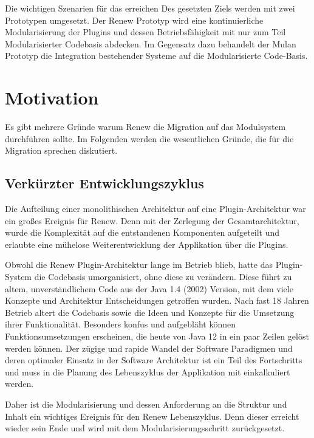 	Die wichtigen Szenarien für das erreichen Des gesetzten Ziels werden mit zwei Prototypen umgesetzt. Der Renew Prototyp wird eine kontinuierliche  Modularisierung der Plugins und dessen Betriebsfähigkeit mit nur zum Teil Modularisierter Codebasis abdecken. Im Gegensatz dazu behandelt der Mulan Prototyp die Integration bestehender Systeme auf die Modularisierte Code-Basis. 




\section{Motivation}\label{sec:motivation}
Es gibt mehrere Gründe warum Renew die Migration auf das Modulsystem durchführen sollte. Im Folgenden werden die wesentlichen Gründe, die für die Migration sprechen diskutiert.  

\subsection{Verkürzter Entwicklungszyklus}\label{sub:vez}
Die Aufteilung einer monolithischen Architektur auf eine Plugin-Architektur war ein großes Ereignis für Renew. Denn mit der Zerlegung der Gesamtarchitektur, wurde die Komplexität auf die entstandenen Komponenten aufgeteilt und erlaubte eine mühelose Weiterentwicklung der Applikation über die Plugins. \bigbreak

Obwohl die Renew Plugin-Architektur lange im Betrieb blieb, hatte das Plugin-System die Codebasis umorganisiert, ohne diese zu verändern. Diese führt zu altem, unverständlichem Code aus der Java 1.4 (2002) Version, mit dem viele Konzepte und Architektur Entscheidungen getroffen wurden. Nach fast 18 Jahren Betrieb altert die Codebasis sowie die Ideen und Konzepte für die Umsetzung ihrer Funktionalität. Besonders konfus und aufgebläht können Funktionsumsetzungen erscheinen, die heute von Java 12 in ein paar Zeilen gelöst werden können. Der zügige und rapide Wandel der Software Paradigmen und deren optimaler Einsatz in der Software Architektur ist ein Teil des Fortschritts und muss in die Planung des Lebenszyklus der Applikation mit einkalkuliert werden. \newline

Daher ist die Modularisierung und dessen Anforderung an die Struktur und Inhalt ein wichtiges Ereignis für den Renew Lebenszyklus. Denn dieser erreicht wieder sein Ende und wird mit dem Modularisierungsschritt zurückgesetzt. \bigbreak


